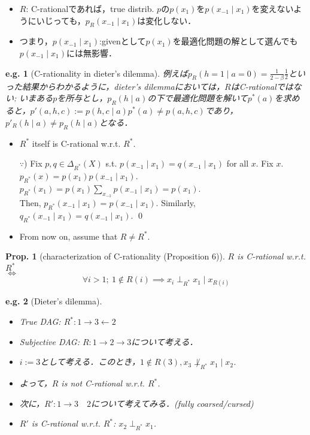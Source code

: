 \documentclass[11pt,a4paper,dvipdfmx]{article}
\theoremstyle{plain}
\newtheorem{prop}{Prop.}[section]
\newtheorem{eg}{e.g.}[section]
\newcommand{\equi}{\Longleftrightarrow}
\begin{document}
\begin{itemize}
	\item $R$: C-rationalであれば，true distrib. $p$の$p(x_1)$を$p(x_{-1} \mid x_1)$を変えないようにいじっても，$p_R(x_{-1} \mid x_1)$は変化しない．
	\item つまり，$p(x_{-1} \mid x_1)$:givenとして$p(x_1)$を最適化問題の解として選んでも$p(x_{-1} \mid x_1)$には無影響．
\end{itemize}

\begin{eg}[C-rationality in dieter's dilemma]
	例えば$p_R(h=1 \mid a=0) = \frac{1}{2 - \beta} \frac{1}{2}$といった結果からわかるように，dieter's dilemmaにおいては，$R$はC-rationalではない:
	いまある$p$を所与とし，$p_R( h \mid a)$の下で最適化問題を解いて$p^*(a)$を求めると，$p'(a,h,c) := p(h, c \mid a) p^*(a) \neq p(a,h,c)$であり，$p'_R(h \mid a) \neq p_R(h \mid a)$となる．
\end{eg}

\begin{itemize}
	\item $R^*$ itself is C-rational w.r.t. $R^*$.
	\item[$\because$)] Fix $p, q \in \Delta_{R^*}(X)$ s.t. $p(x_{-1} \mid x_1) = q(x_{-1} \mid x_1)$ for all $x$. Fix $x$.\\
		$p_{R^*}(x) = p(x_1) p(x_{-1} \mid x_1)$. $p_{R^*}(x_1) = p(x_1) \sum_{x_{-1}} p(x_{-1} \mid x_1) = p(x_1)$. \\
	 Then, $p_{R^*}(x_{-1} \mid x_1) = p(x_{-1} \mid x_1)$. Similarly, $q_{R^*}(x_{-1} \mid x_1) = q(x_{-1} \mid x_1)$. \qed 
	\item From now on, assume that $R \neq R^*$.
\end{itemize}

\begin{screen}
\begin{prop}[characterization of C-rationality (Proposition 6)] \label{prop6-1}
	$R$ is C-rational w.r.t. $R^*$ \\
	$\equi$
	$$
	\forall i > 1; \ 1 \notin R(i) \implies x_i \perp_{R^*} x_1 \mid x_{R(i)}
	$$ 
\end{prop}
\end{screen}

\begin{screen}
\begin{eg}[Dieter's dilemma]
\begin{itemize}
	\item True DAG: $R^*: 1 \to 3 \leftarrow 2$
	\item Subjective DAG: $R: 1 \to 2 \to 3$について考える．
	\item $i:=3$として考える．このとき，$1 \notin R(3), x_3 \not\perp_{R^*} x_1 \mid x_2$.
	\item よって，$R$ is not C-rational w.r.t. $R^*$.
	\item 次に，$R':1 \to 3 \quad 2$について考えてみる．(fully coarsed/cursed)
	\item $R'$ is C-rational w.r.t. $R^*$: $x_2 \perp_{R^*} x_1$.
\end{itemize}
\end{eg}
\end{screen}
\end{document}
